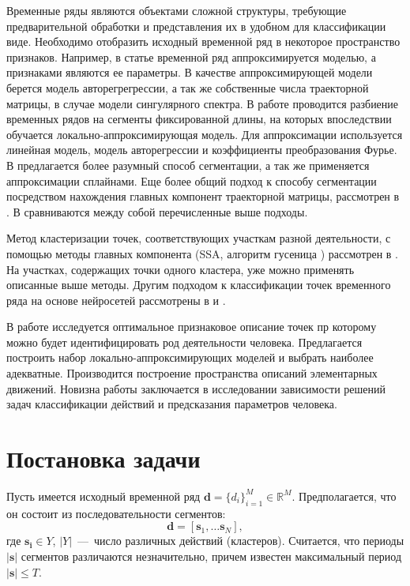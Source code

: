\documentclass[12pt, twoside]{article}
\begin{document}
Временные ряды являются объектами сложной структуры, требующие предварительной обработки и представления их в удобном для классификации виде. Необходимо отобразить исходный временной ряд в некоторое пространство признаков. Например, в статье \cite{Ivkin15} временной ряд аппроксимируется моделью, а признаками являются ее параметры. В качестве аппроксимирующей модели берется модель авторегрегрессии, а так же собственные числа траекторной матрицы, в случае модели сингулярного спектра. В работе \cite{Karasikov16} проводится разбиение временных рядов на сегменты фиксированной длины, на которых впоследствии обучается локально-аппроксимирующая модель. Для аппроксимации используется линейная модель, модель авторегрессии и коэффициенты преобразования Фурье. В \cite{Anikeev18} предлагается более разумный способ сегментации, а так же применяется аппроксимации сплайнами. Еще более общий подход к способу сегментации посредством нахождения главных компонент траекторной матрицы, рассмотрен в \cite{Motrenko16}. В \cite{Bochkarev18} сравниваются между собой перечисленные выше подходы.

Метод кластеризации точек, соответствующих участкам разной деятельности, с помощью методы главных компонента (SSA, алгоритм гусеница \cite{Danilov97}) рассмотрен в \cite{Grabovoy20}. На участках, содержащих точки одного кластера, уже можно применять описанные выше методы. Другим подходом к классификации точек временного ряда на основе нейросетей рассмотрены в \cite{Dafne19} и \cite{Cinar18}.

В работе исследуется оптимальное признаковое описание точек пр которому можно будет идентифицировать род деятельности человека. Предлагается построить набор локально-аппроксимирующих моделей и выбрать наиболее адекватные. Производится построение пространства описаний элементарных движений. Новизна работы заключается в исследовании зависимости решений задач классификации действий и предсказания параметров человека.

\section{Постановка задачи}

Пусть имеется исходный временной ряд $\mathbf{d}=\{d_i\}_{i=1}^M\in \mathds{R}^M$. Предполагается, что он состоит из последовательности сегментов: 
\begin{equation}\label{eq0}
\mathbf{d}=[\mathbf{s}_1, \ldots \mathbf{s}_N],
\end{equation}
 где $\mathbf{s_i}\in Y$, $|Y|$~---~число различных действий (кластеров). Считается, что периоды $|\mathbf{s}|$ сегментов различаются незначительно, причем известен максимальный период $|\mathbf{s}|\leq T$.
\end{document}
